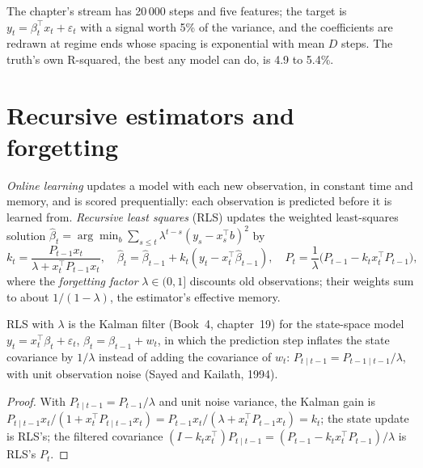 The chapter's stream has 20\,000 steps and five features; the target is $y_t = \beta_t^\top x_t + \varepsilon_t$ with a
signal worth 5\% of the variance, and the coefficients are redrawn at regime ends whose spacing is exponential with
mean $D$ steps. The truth's own R-squared, the best any model can do, is 4.9 to 5.4\%.

\section{Recursive estimators and forgetting}

\begin{definition}\label{def:ml:online-learning-and-drift:rls}
\emph{Online learning} updates a model with each new observation, in constant time and memory,
and is scored prequentially: each observation is predicted before it is learned from. \emph{Recursive least
squares} (RLS) updates the weighted least-squares solution
$\hat\beta_t = \arg\min_b\sum_{s\le t}\lambda^{t-s}(y_s - x_s^\top b)^2$ by
\[
k_t = \frac{P_{t-1}x_t}{\lambda + x_t^\top P_{t-1}x_t},\quad \hat\beta_t = \hat\beta_{t-1} + k_t(y_t - x_t^\top\hat\beta_{t-1}),\quad
P_t = \frac{1}{\lambda}\bigl(P_{t-1} - k_tx_t^\top P_{t-1}\bigr),
\]
where the \emph{forgetting factor} $\lambda\in(0,1]$ discounts old observations; their weights sum
to about $1/(1-\lambda)$, the estimator's effective memory.
\end{definition}

\begin{proposition}\label{prop:ml:online:kalman}
RLS with  $\lambda$ is the Kalman filter (Book~4, chapter~19) for the state-space model $y_t =
x_t^\top\beta_t + \varepsilon_t$, $\beta_t = \beta_{t-1} + w_t$, in which the prediction step inflates the state covariance
by $1/\lambda$ instead of adding the covariance of $w_t$: $P_{t\mid t-1} = P_{t-1\mid t-1}/\lambda$, with unit observation
noise (Sayed and Kailath, 1994).
\end{proposition}

\begin{proof}
With $P_{t\mid t-1} = P_{t-1}/\lambda$ and unit noise variance, the Kalman gain is $P_{t\mid t-1}x_t/(1 + x_t^\top P_{t\mid
t-1}x_t) = P_{t-1}x_t/(\lambda + x_t^\top P_{t-1}x_t) = k_t$; the state update is RLS's; the filtered covariance
$(I - k_tx_t^\top)P_{t\mid t-1} = (P_{t-1} - k_tx_t^\top P_{t-1})/\lambda$ is RLS's $P_t$.
\end{proof}

